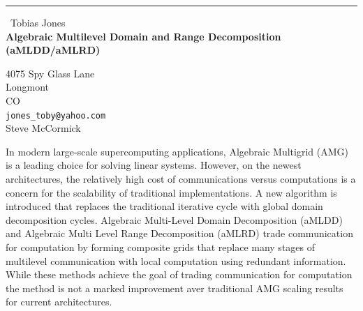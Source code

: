 \documentclass{report}
\begin{document}
\begin{center}
\rule{6in}{1pt} \
{\large Tobias Jones \\
{\bf Algebraic Multilevel Domain and Range Decomposition (aMLDD/aMLRD)}}

4075 Spy Glass Lane \\ Longmont \\ CO
\\
{\tt jones_toby@yahoo.com}\\
Steve McCormick\end{center}

In modern large-scale supercomputing applications, Algebraic Multigrid
(AMG) is a leading choice for solving linear systems. However, on the
newest architectures, the relatively high cost of communications versus
computations is a concern for the scalability of traditional
implementations. A new algorithm is introduced that replaces the
traditional iterative cycle with global domain decomposition cycles.
Algebraic Multi-Level Domain Decomposition (aMLDD) and Algebraic Multi
Level Range Decomposition (aMLRD) trade communication for computation by
forming composite grids that replace many stages of multilevel
communication with local computation using redundant information. While
these methods achieve the goal of trading communication for computation
the method is not a marked improvement aver traditional AMG scaling
results for current architectures.
\end{document}
